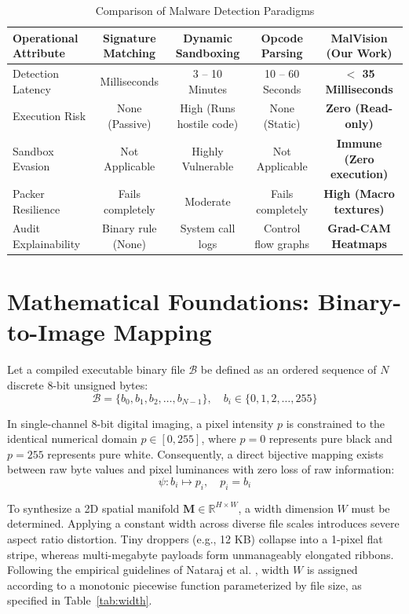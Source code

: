 \documentclass[journal,10pt,twocolumn]{IEEEtran}
\begin{document}
\begin{table}[!t]
\caption{Comparison of Malware Detection Paradigms\label{tab:paradigms}}
\centering
\begin{tabular}{lcccc}
\toprule
\textbf{Operational Attribute} & \textbf{Signature Matching} & \textbf{Dynamic Sandboxing} & \textbf{Opcode Parsing} & \textbf{MalVision (Our Work)} \\
\midrule
Detection Latency & Milliseconds & 3 -- 10 Minutes & 10 -- 60 Seconds & \textbf{$<$ 35 Milliseconds} \\
Execution Risk & None (Passive) & High (Runs hostile code) & None (Static) & \textbf{Zero (Read-only)} \\
Sandbox Evasion & Not Applicable & Highly Vulnerable & Not Applicable & \textbf{Immune (Zero execution)} \\
Packer Resilience & Fails completely & Moderate & Fails completely & \textbf{High (Macro textures)} \\
Audit Explainability & Binary rule (None) & System call logs & Control flow graphs & \textbf{Grad-CAM Heatmaps} \\
\bottomrule
\end{tabular}
\end{table}

\section{Mathematical Foundations: Binary-to-Image Mapping}
Let a compiled executable binary file $\mathcal{B}$ be defined as an ordered sequence of $N$ discrete 8-bit unsigned bytes:
\begin{equation}
\mathcal{B} = \{b_0, b_1, b_2, \dots, b_{N-1}\}, \quad b_i \in \{0, 1, 2, \dots, 255\}
\end{equation}

In single-channel 8-bit digital imaging, a pixel intensity $p$ is constrained to the identical numerical domain $p \in [0, 255]$, where $p = 0$ represents pure black and $p = 255$ represents pure white. Consequently, a direct bijective mapping exists between raw byte values and pixel luminances with zero loss of raw information:
\begin{equation}
\psi: b_i \mapsto p_i, \quad p_i = b_i
\end{equation}

To synthesize a 2D spatial manifold $\mathbf{M} \in \mathbb{R}^{H \times W}$, a width dimension $W$ must be determined. Applying a constant width across diverse file scales introduces severe aspect ratio distortion. Tiny droppers (e.g., 12 KB) collapse into a 1-pixel flat stripe, whereas multi-megabyte payloads form unmanageably elongated ribbons. Following the empirical guidelines of Nataraj et al. \cite{nataraj2011}, width $W$ is assigned according to a monotonic piecewise function parameterized by file size, as specified in Table~\ref{tab:width}.
\end{document}
